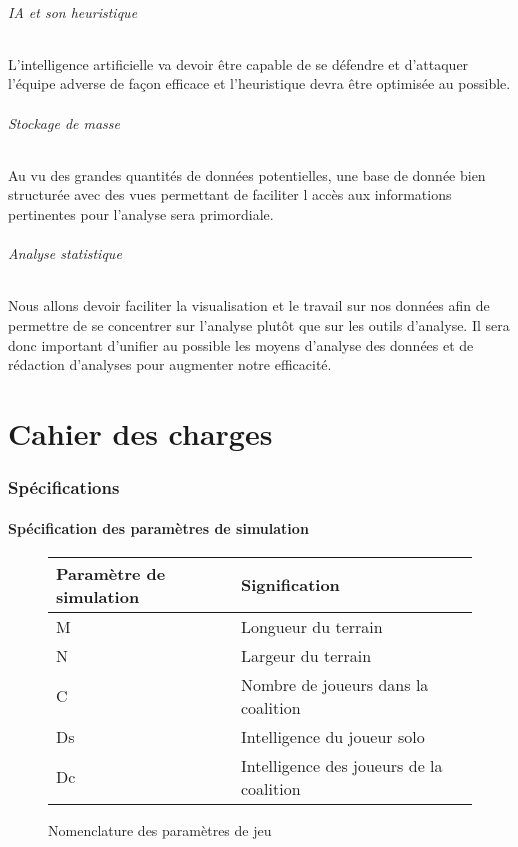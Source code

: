 		\paragraph{IA et son heuristique}
		L'intelligence artificielle va devoir être capable de se défendre et d'attaquer l'équipe adverse de façon efficace et l'heuristique devra être optimisée au possible.
		
		\paragraph{Stockage de masse}
		Au vu des grandes quantités de données potentielles, une base de donnée bien structurée avec des vues permettant de faciliter l accès aux informations pertinentes pour l'analyse sera primordiale.
		
		\paragraph{Analyse statistique}
		Nous allons devoir faciliter la visualisation et le travail sur nos données afin de permettre de se concentrer sur l'analyse plutôt que sur les outils d'analyse. Il sera donc important d'unifier au possible les moyens d'analyse des données et de rédaction d'analyses pour augmenter notre efficacité.
		
		
		\part{Cahier des charges}
		

		
		
		\section{Spécifications}
			\subsection{Spécification des paramètres de simulation}
				
				\begin{figure}[H]
					\centering
					\begin{tabular}{l l}
						Paramètre de simulation&Signification\\\hline
						M & Longueur du terrain\\
						N & Largeur du terrain\\
						C & Nombre de joueurs dans la coalition\\
						Ds & Intelligence du joueur solo\\
						Dc & Intelligence des joueurs de la coalition
					\end{tabular}
					\caption{Nomenclature des paramètres de jeu}				
				\end{figure}
				
